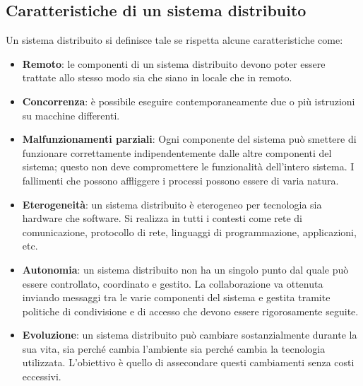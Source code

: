 \subsection{Caratteristiche di un sistema distribuito}
\label{subsec:caratteristiche di un sistema distribuito}
Un sistema distribuito si definisce tale se rispetta alcune caratteristiche come: 
\begin{itemize}
\item \textbf{Remoto}: le componenti di un sistema distribuito devono poter essere trattate allo stesso modo sia che siano in locale che in remoto.
\item \textbf{Concorrenza}: è possibile eseguire contemporaneamente due o più istruzioni su macchine differenti.
\item \textbf{Malfunzionamenti parziali}: Ogni componente del sistema può smettere di funzionare correttamente indipendentemente dalle altre componenti del sistema; questo non deve compromettere le funzionalità dell'intero sistema. I fallimenti che possono affliggere i processi possono essere di varia natura.
\item \textbf{Eterogeneità}: un sistema distribuito è eterogeneo per tecnologia sia hardware che software. Si realizza in tutti i contesti come rete di comunicazione, protocollo di rete, linguaggi di programmazione, applicazioni, etc.
\item \textbf{Autonomia}: un sistema distribuito non ha un singolo punto dal quale può essere controllato, coordinato e gestito. La collaborazione va ottenuta inviando messaggi tra le varie componenti del sistema e gestita tramite politiche di condivisione e di accesso che devono essere rigorosamente seguite. 
\item \textbf{Evoluzione}: un sistema distribuito può cambiare sostanzialmente durante la sua vita, sia perché cambia l'ambiente sia perché cambia la tecnologia utilizzata. L'obiettivo è quello di assecondare questi cambiamenti senza costi eccessivi.\cite{distSist:caratteristiche}
\end{itemize}

